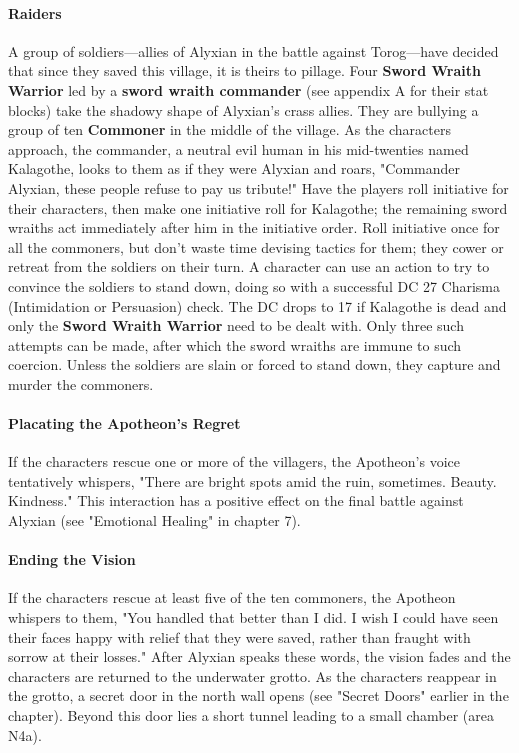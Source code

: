 \documentclass[10pt,a4,twoside,twocolumn,openany,nodeprecatedcode]{dndbook}
\begin{document}
\paragraph{Raiders}
A group of soldiers—allies of Alyxian in the battle against Torog—have decided that since they saved this village, it is theirs to pillage. Four \textbf{Sword Wraith Warrior} led by a \textbf{sword wraith commander} (see appendix A for their stat blocks) take the shadowy shape of Alyxian's crass allies. They are bullying a group of ten \textbf{Commoner} in the middle of the village. As the characters approach, the commander, a neutral evil human in his mid-twenties named Kalagothe, looks to them as if they were Alyxian and roars, "Commander Alyxian, these people refuse to pay us tribute!"
Have the players roll initiative for their characters, then make one initiative roll for Kalagothe; the remaining sword wraiths act immediately after him in the initiative order. Roll initiative once for all the commoners, but don't waste time devising tactics for them; they cower or retreat from the soldiers on their turn.
A character can use an action to try to convince the soldiers to stand down, doing so with a successful DC 27 Charisma (Intimidation or Persuasion) check. The DC drops to 17 if Kalagothe is dead and only the \textbf{Sword Wraith Warrior} need to be dealt with. Only three such attempts can be made, after which the sword wraiths are immune to such coercion.
Unless the soldiers are slain or forced to stand down, they capture and murder the commoners.
\paragraph{Placating the Apotheon's Regret}
If the characters rescue one or more of the villagers, the Apotheon's voice tentatively whispers, "There are bright spots amid the ruin, sometimes. Beauty. Kindness." This interaction has a positive effect on the final battle against Alyxian (see "Emotional Healing" in chapter 7).
\paragraph{Ending the Vision}
If the characters rescue at least five of the ten commoners, the Apotheon whispers to them, "You handled that better than I did. I wish I could have seen their faces happy with relief that they were saved, rather than fraught with sorrow at their losses." After Alyxian speaks these words, the vision fades and the characters are returned to the underwater grotto. As the characters reappear in the grotto, a secret door in the north wall opens (see "Secret Doors" earlier in the chapter). Beyond this door lies a short tunnel leading to a small chamber (area N4a).
\end{document}
